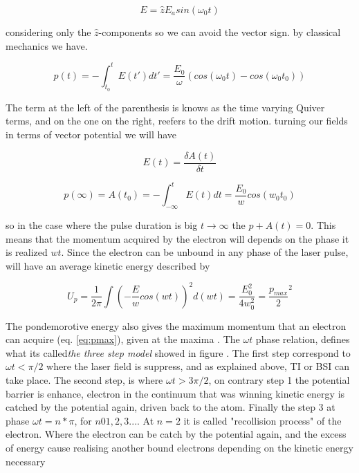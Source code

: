 \begin{equation}
E=\widehat{z}E_{a}sin(\omega_{0} t) 
\end{equation}

considering only the $\widehat{z}$-components so we can avoid the vector sign. by classical mechanics we have.

\begin{equation}
p(t)=-\int_{t_{0}}^{t} E(t\prime)dt\prime = \dfrac{E_{0}}{\omega} (cos(\omega_{0} t)- cos(\omega_{0} t_{0}))
\end{equation}

The term at the left of the parenthesis is knows as the time varying Quiver terms, and on the one on the right, reefers to the drift motion. 
turning our fields in terms of vector potential we will have

\begin{equation}
E(t) = \dfrac{\delta A(t)}{\delta t}
\end{equation}

\begin{equation}
p(\infty) = A(t_{0}) = -\int_{-\infty}^{t} E(t) dt = \dfrac{E_{0}}{w} cos(w_{0}t_{0})
\label{eq:pmax}
\end{equation}

so in the case where the pulse  duration is big $t \longrightarrow \infty$ the $p + A(t) = 0$. This means that the momentum acquired by the electron will depends on the phase it is realized $wt$. Since the electron can be unbound in any phase of the laser pulse, will have an average kinetic energy described by

\begin{equation} 
U_{p} = \dfrac{1}{2\pi} \int (-\dfrac{E}{w} cos (wt))^{2}d(wt) = \dfrac{E^{2}_{0}}{4w^{2}_{0}} = \dfrac{p_{max}}{2}^{2}
\label{eq:pondeenergy}
\end{equation}

The pondemorotive energy also gives the maximum momentum that an electron can acquire (eq. \ref{eq:pmax}), given at the maxima . The $\omega t$ phase relation, defines what its called\textit{the three step model} showed in figure . The first step correspond to $\omega t < \pi /2$ where the laser field is suppress, and as explained above, TI or BSI can take place. The second step, is where $\omega t > 3\pi /2$, on contrary step 1 the potential barrier is enhance, electron in the continuum that was winning kinetic energy is catched by the potential again, driven  back to the atom. Finally the step 3 at  phase  $\omega t = n* \pi$, for $n 0 1,2,3...$. At $n=2$ it is called "recollision process" of the electron. Where the electron can be catch by the potential again, and the excess of energy cause realising another bound electrons depending on the kinetic energy necessary \cite{krishnan_ignition_2012}

